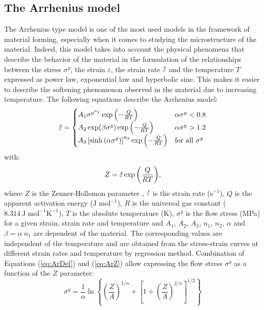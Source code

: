 \documentclass[twoside,english,1p,final,sort&compress]{elsarticle}
\theoremstyle{plain}
\DeclareRobustCommand{\mdot}[1]{\accentset{\mbox{\bfseries .}}{#1}}
\DeclareRobustCommand{\ps}{\text{s}^{-1}}
\begin{document}
\subsection{The Arrhenius model\label{sec:ARmodel}}

The Arrhenius type model \cite{Sellars-1966} is one of the most used models in the framework of material forming, especially when it comes to studying the microstructure of the material.
Indeed, this model takes into account the physical phenomena that describe the behavior of the material in the formulation of the relationships between the stress $\sigma^y$, the strain $\varepsilon$, the strain rate $\mdot\varepsilon$ and the temperature $T$ expressed as power law, exponential law and hyperbolic sine.
This makes it easier to describe the softening phenomenon observed in the material due to increasing temperature.
The following equations describe the Arrhenius model:
\begin{equation}
\mdot\varepsilon =
\begin{cases}
A_1 \sigma^{y^{n_1}} \exp{\left(-\frac{Q}{RT}\right)} & \alpha\sigma^y < 0.8\\
A_2 \exp(\beta\sigma^y) \exp{\left(-\frac{Q}{RT}\right)} & \alpha\sigma^y > 1.2\\
A_3 \left[\sinh{\left(\alpha\sigma^y\right)}\right]^{n_2} \exp{\left(-\frac{Q}{RT}\right)} & \text{for all }\sigma^y
\end{cases}
\label{eq:ArDef}
\end{equation}
with:
\begin{equation}
Z = \mdot\varepsilon \exp{\left(\frac{Q}{RT}\right)}, \label{eq:ArZ}
\end{equation}
where $Z$ is the Zenner-Hollomon parameter \cite{Zener-1944}, $\mdot\varepsilon$ is the strain rate ($\ps$), $Q$ is the apparent activation energy ($\text{J~mol}^{-1}$), $R$ is the universal gas constant ($8.314~\text{J~mol}^{-1} \text{K}^{-1}$), $T$ is the absolute temperature (K), $\sigma^y$ is the flow stress (MPa) for a given strain, strain rate and temperature and $A_1$, $A_2$, $A_3$, $n_1$, $n_2$, $\alpha$ and $\beta=\alpha~n_1$ are dependent of the material.
The corresponding values are independent of the temperature and are obtained from the stress-strain curves at different strain rates and temperature by regression method.
Combination of Equations (\ref{eq:ArDef}) and (\ref{eq:ArZ}) allow expressing the flow stress $\sigma^y$ as a function of the $Z$ parameter:
\begin{equation}
\sigma^y = \frac{1}{\alpha} \ln\left\{\left(\frac{Z}{A}\right)^{1/n} + \left[1 + \left(\frac{Z}{A}\right)^{2/n}\right]^{1/2}\right\}
\end{equation}
\end{document}
